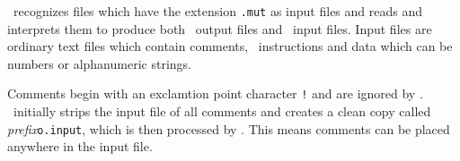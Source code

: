 \label{tex:InputFile}
\mut\ recognizes files which have the extension \verb+.mut+ as input files and reads and interprets them to produce both \mfus\ output files and \tecplot\ input files. Input files are ordinary text files which contain comments, \mut\ instructions and data which can be numbers or alphanumeric strings.

Comments begin with an exclamtion point character \verb+!+ and are ignored by \mut.  \mut\ initially strips the input file of all comments and creates a clean copy called \textit{prefix}\verb+o.input+, which is then processed by \mut.  This means comments can be placed anywhere in the input file.


